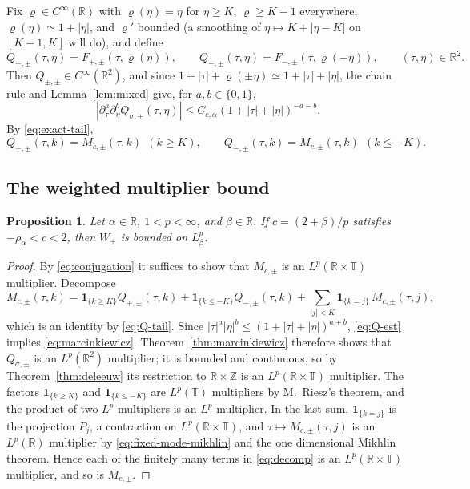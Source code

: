 \documentclass[11pt,a4paper,reqno,backref=page]{amsart}
\newcommand{\R}{\mathbb R}
\newcommand{\Z}{\mathbb Z}
\newcommand{\T}{\mathbb T}
\newcommand{\ind}{\mathbf 1}
\numberwithin{equation}{section}
\newtheorem{proposition}[theorem]{Proposition}
\theoremstyle{definition}
\theoremstyle{remark}
\begin{document}
Fix $\varrho\in C^\infty(\R)$ with $\varrho(\eta)=\eta$ for
$\eta\ge K$, $\varrho\ge K-1$ everywhere,
$\varrho(\eta)\simeq1+|\eta|$, and $\varrho'$ bounded (a
smoothing of $\eta\mapsto K+|\eta-K|$ on $[K-1,K]$ will do), and
define
\begin{equation}\label{eq:extension}
  Q_{+,\pm}(\tau,\eta)=F_{+,\pm}(\tau,\varrho(\eta)),\qquad
  Q_{-,\pm}(\tau,\eta)=F_{-,\pm}(\tau,\varrho(-\eta)),\qquad
  (\tau,\eta)\in\R^2.
\end{equation}
Then $Q_{\pm,\pm}\in C^\infty(\R^2)$, and since
$1+|\tau|+\varrho(\pm\eta)\simeq1+|\tau|+|\eta|$, the chain rule
and Lemma~\ref{lem:mixed} give, for $a,b\in\{0,1\}$,
\begin{equation}\label{eq:Q-est}
  |\partial_\tau^a\partial_\eta^b Q_{\sigma,\pm}(\tau,\eta)|
  \le C_{c,\alpha}(1+|\tau|+|\eta|)^{-a-b}.
\end{equation}
By \eqref{eq:exact-tail},
\begin{equation}\label{eq:Q-tail}
  Q_{+,\pm}(\tau,k)=M_{c,\pm}(\tau,k)\ \ (k\ge K),\qquad
  Q_{-,\pm}(\tau,k)=M_{c,\pm}(\tau,k)\ \ (k\le-K).
\end{equation}

\subsection{The weighted multiplier bound}

\begin{proposition}\label{prop:weighted-suff}
Let $\alpha\in\R$, $1<p<\infty$, and $\beta\in\R$. If
$c=(2+\beta)/p$ satisfies $-\rho_\alpha<c<2$, then $W_\pm$ is
bounded on $L^p_\beta$.
\end{proposition}

\begin{proof}
By \eqref{eq:conjugation} it suffices to show that $M_{c,\pm}$
is an $L^p(\R\times\T)$ multiplier. Decompose
\begin{equation}\label{eq:decomp}
  M_{c,\pm}(\tau,k)=\ind_{\{k\ge K\}}Q_{+,\pm}(\tau,k)
  +\ind_{\{k\le-K\}}Q_{-,\pm}(\tau,k)
  +\sum_{|j|<K}\ind_{\{k=j\}}\,M_{c,\pm}(\tau,j),
\end{equation}
which is an identity by \eqref{eq:Q-tail}. Since
$|\tau|^a|\eta|^b\le(1+|\tau|+|\eta|)^{a+b}$, \eqref{eq:Q-est}
implies \eqref{eq:marcinkiewicz}.
Theorem~\ref{thm:marcinkiewicz} therefore shows that
$Q_{\sigma,\pm}$ is an $L^p(\R^2)$ multiplier; it is bounded and
continuous, so by Theorem~\ref{thm:deleeuw} its restriction to
$\R\times\Z$ is an $L^p(\R\times\T)$ multiplier. The factors
$\ind_{\{k\ge K\}}$ and $\ind_{\{k\le-K\}}$ are $L^p(\T)$
multipliers by M.~Riesz's theorem, and the product of two $L^p$
multipliers is an $L^p$ multiplier. In the last sum,
$\ind_{\{k=j\}}$ is the projection $P_j$, a contraction on
$L^p(\R\times\T)$, and $\tau\mapsto M_{c,\pm}(\tau,j)$ is an
$L^p(\R)$ multiplier by \eqref{eq:fixed-mode-mikhlin} and the
one dimensional Mikhlin theorem. Hence each of the finitely many
terms in \eqref{eq:decomp} is an $L^p(\R\times\T)$ multiplier,
and so is $M_{c,\pm}$. 
\end{proof}
\end{document}
